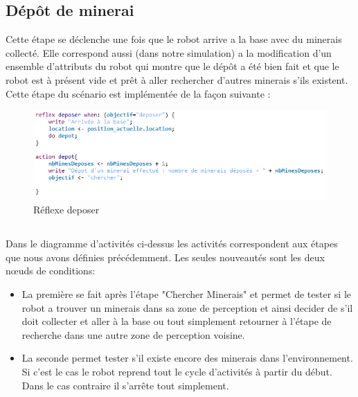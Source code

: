 \subsection{Dépôt de minerai}

Cette étape se déclenche une fois que le robot arrive a la base avec du minerais collecté. Elle correspond aussi (dans notre simulation) a la modification d'un ensemble d'attributs du robot qui montre que le dépôt a été bien fait et que le robot est à présent vide et prêt à aller rechercher d'autres minerais s'ils existent.\\
\newpage
Cette étape du scénario est implémentée de la façon suivante : 
\begin{figure}[!h]
	\begin{center}
		\includegraphics{code/deposer}
	\end{center}
	\caption{Réflexe deposer}
\end{figure}


\subsection*{} 
Dans le diagramme d'activités ci-dessus les activités correspondent aux étapes que nous avons définies précédemment. Les seules nouveautés sont les deux nœuds de conditions:
\begin{itemize}
	\item La première se fait après l'étape "Chercher Minerais" et permet de tester si le robot a trouver un minerais dans sa zone de perception et ainsi 
	decider de s'il doit collecter et aller à la base ou tout simplement retourner à l'étape de recherche dans une autre zone de perception voisine.
	
	\item La seconde permet tester s'il existe encore des minerais dans l'environnement. Si c'est le cas le robot reprend tout le cycle d'activités à partir du début. Dans le cas contraire il s'arrête tout simplement.
\end{itemize}
